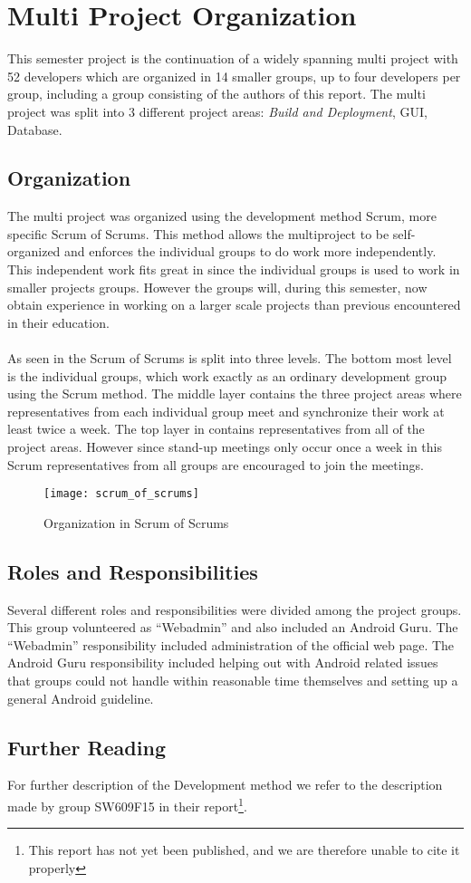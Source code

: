 
\section{Multi Project Organization}
\label{sec:multi_project_organization}

This semester project is the continuation of a widely spanning multi project with 52 developers which are organized in 14 smaller groups, up to four developers per group, including a group consisting of the authors of this report. The multi project was split into 3 different project areas: \emph{Build and Deployment}, GUI, Database. 

\subsection{Organization}
The multi project was organized using the development method Scrum\parencite{scrum}, more specific Scrum of Scrums. This method allows the multiproject to be self-organized and enforces the individual groups to do work more independently. This independent work fits great in since the individual groups is used to work in smaller projects groups. However the groups will, during this semester, now obtain experience in working on a larger scale projects than previous encountered in their education. 
\\\\
As seen in  the Scrum of Scrums is split into three levels. The bottom most level is the individual groups, which work exactly as an ordinary development group using the Scrum method. The middle layer contains the three project areas where representatives from each individual group meet and synchronize their work at least twice a week. The top layer in  contains representatives from all of the project areas. However since stand-up meetings only occur once a week in this Scrum representatives from all groups are encouraged to join the meetings.

\begin{figure}[!htbp]
  \centering
    \texttt{[image: scrum\_of\_scrums]}
    \caption{Organization in Scrum of Scrums}
    \label{fig:scrum_of_scrums}
\end{figure}


\subsection{Roles and Responsibilities}
Several different roles and responsibilities were divided among the project groups. This group volunteered as ``Webadmin'' and also included an Android Guru. The ``Webadmin'' responsibility included administration of the official \giraf web page. The Android Guru responsibility included helping out with Android related issues that groups could not handle within reasonable time themselves and setting up a general Android guideline. 

\subsection{Further Reading}
For further description of the \giraf Development method we refer to the description made by group SW609F15 in their report\footnote{This report has not yet been published, and we are therefore unable to cite it properly}.